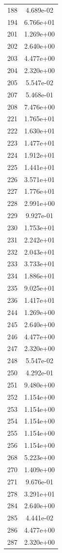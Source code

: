\documentclass[12pt]{article}
\begin{document}
\begin{longtable}{@{}cc@{}}
188 & 4.689e-02 \\
194 & 6.766e+01 \\
201 & 1.269e+00 \\
202 & 2.640e+00 \\
203 & 4.477e+00 \\
204 & 2.320e+00 \\
205 & 5.547e-02 \\
207 & 5.468e-01 \\
208 & 7.476e+00 \\
221 & 1.765e+01 \\
222 & 1.630e+01 \\
223 & 1.477e+01 \\
224 & 1.912e+01 \\
225 & 1.441e+01 \\
226 & 3.571e+01 \\
227 & 1.776e+01 \\
228 & 2.991e+00 \\
229 & 9.927e-01 \\
230 & 1.753e+01 \\
231 & 2.242e+01 \\
232 & 2.043e+01 \\
233 & 3.733e+01 \\
234 & 1.886e+01 \\
235 & 9.025e+01 \\
236 & 1.417e+01 \\
244 & 1.269e+00 \\
245 & 2.640e+00 \\
246 & 4.477e+00 \\
247 & 2.320e+00 \\
248 & 5.547e-02 \\
250 & 4.292e-01 \\
251 & 9.480e+00 \\
252 & 1.154e+00 \\
253 & 1.154e+00 \\
254 & 1.154e+00 \\
255 & 1.154e+00 \\
256 & 1.154e+00 \\
268 & 5.223e+00 \\
270 & 1.409e+00 \\
271 & 9.676e-01 \\
278 & 3.291e+01 \\
284 & 2.640e+00 \\
285 & 4.441e-02 \\
286 & 4.477e+00 \\
287 & 2.320e+00 \\

\end{longtable}
\end{document}
